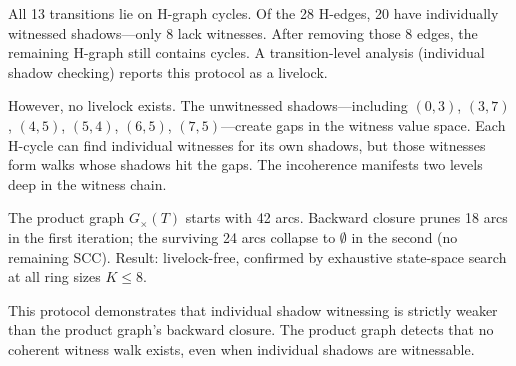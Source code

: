 \documentclass[11pt]{article}
\begin{document}
All 13 transitions lie on H-graph cycles. Of the 28 H-edges, 20 have individually witnessed shadows---only 8 lack witnesses. After removing those 8 edges, the remaining H-graph still contains cycles. A transition-level analysis (individual shadow checking) reports this protocol as a livelock.

However, no livelock exists. The unwitnessed shadows---including $(0,3)$, $(3,7)$, $(4,5)$, $(5,4)$, $(6,5)$, $(7,5)$---create gaps in the witness value space. Each H-cycle can find individual witnesses for its own shadows, but those witnesses form walks whose shadows hit the gaps. The incoherence manifests two levels deep in the witness chain.

The product graph $G_\times(T)$ starts with 42 arcs. Backward closure prunes 18 arcs in the first iteration; the surviving 24 arcs collapse to $\emptyset$ in the second (no remaining SCC). Result: livelock-free, confirmed by exhaustive state-space search at all ring sizes $K \leq 8$.

This protocol demonstrates that individual shadow witnessing is strictly weaker than the product graph's backward closure. The product graph detects that no coherent witness walk exists, even when individual shadows are witnessable.
\end{document}
